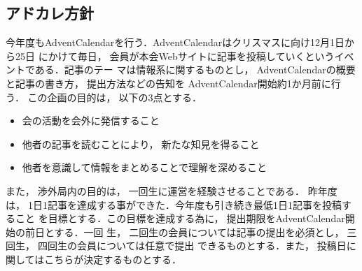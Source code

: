 \subsection*{アドカレ方針}


今年度もAdventCalendarを行う．AdventCalendarはクリスマスに向け12月1日から25日
にかけて毎日，会員が本会Webサイトに記事を投稿していくというイベントである．記事のテー
マは情報系に関するものとし，AdventCalendarの概要と記事の書き方，提出方法などの告知を
AdventCalendar開始約1か月前に行う．
この企画の目的は，以下の3点とする．
\begin{itemize}
    \item 会の活動を会外に発信すること
    \item 他者の記事を読むことにより，新たな知見を得ること
    \item 他者を意識して情報をまとめることで理解を深めること
\end{itemize}

また，渉外局内の目的は，一回生に運営を経験させることである．
昨年度は，1日1記事を達成する事ができた．今年度も引き続き最低1日1記事を投稿すること
を目標とする．この目標を達成する為に，提出期限をAdventCalendar開始の前日とする．一回
生，二回生の会員については記事の提出を必須とし，三回生，四回生の会員については任意で提出
できるものとする．また，投稿日に関してはこちらが決定するものとする．